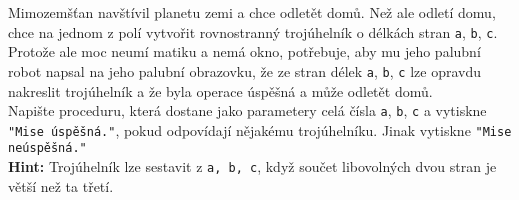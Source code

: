 \question[50]
Mimozemšťan navštívil planetu zemi a chce odletět domů. Než ale odletí domu,
chce na jednom z polí vytvořit rovnostranný trojúhelník o délkách stran
\texttt{a}, \texttt{b}, \texttt{c}. Protože ale moc neumí matiku a nemá okno,
potřebuje, aby mu jeho
palubní robot napsal na jeho palubní obrazovku, že ze stran délek \texttt{a},
\texttt{b}, \texttt{c} lze opravdu nakreslit trojúhelník a že
byla operace úspěšná a
může odletět domů.\\
Napište proceduru, která dostane jako parametery celá čísla \texttt{a},
\texttt{b}, \texttt{c} a vytiskne \texttt{"Mise úspěšná."}, pokud odpovídají
nějakému trojúhelníku. Jinak vytiskne \texttt{"Mise neúspěšná."}\\
\textbf{Hint:} Trojúhelník lze sestavit z \texttt{a, b, c}, když součet
libovolných dvou stran je větší než ta třetí.